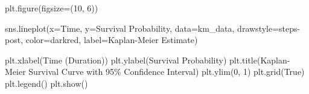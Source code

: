 \documentclass[
  letterpaper,
  DIV=11,
  numbers=noendperiod]{scrartcl}
\newenvironment{Shaded}{\begin{snugshade}}{\end{snugshade}}
\newcommand{\NormalTok}[1]{\textcolor[rgb]{0.00,0.23,0.31}{#1}}
\begin{document}
\begin{Shaded}
\begin{Highlighting}[]
\NormalTok{plt.figure(figsize=(10, 6))}

\NormalTok{sns.lineplot(x=\textquotesingle{}Time\textquotesingle{}, y=\textquotesingle{}Survival Probability\textquotesingle{}, data=km\_data, drawstyle=\textquotesingle{}steps{-}post\textquotesingle{}, color=\textquotesingle{}darkred\textquotesingle{}, label=\textquotesingle{}Kaplan{-}Meier Estimate\textquotesingle{})}

\NormalTok{plt.xlabel(\textquotesingle{}Time (Duration)\textquotesingle{})}
\NormalTok{plt.ylabel(\textquotesingle{}Survival Probability\textquotesingle{})}
\NormalTok{plt.title(\textquotesingle{}Kaplan{-}Meier Survival Curve with 95\% Confidence Interval\textquotesingle{})}
\NormalTok{plt.ylim(0, 1)}
\NormalTok{plt.grid(True)}
\NormalTok{plt.legend()}
\NormalTok{plt.show()}
\end{Highlighting}
\end{Shaded}
\end{document}
